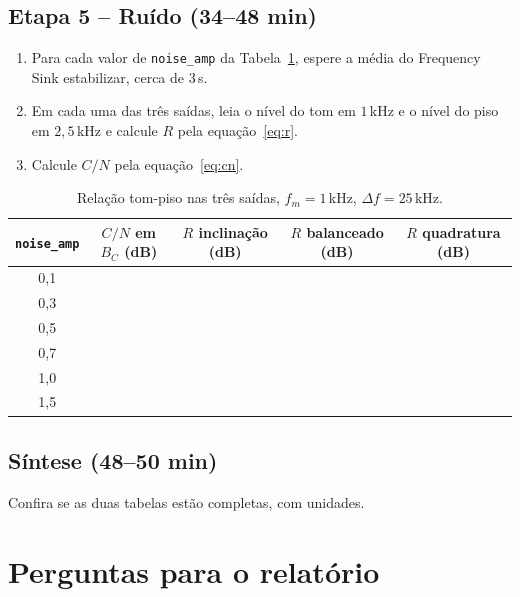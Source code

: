 \documentclass[11pt,a4paper]{article}
\begin{document}
\subsection*{Etapa 5 -- Ruído (34--48 min)}

\begin{instrucao}
\begin{enumerate}[label=\arabic*.]
  \item Para cada valor de \texttt{noise\_amp} da Tabela~\ref{tab:ruido},
    espere a média do Frequency Sink estabilizar, cerca de $3$\,s.
  \item Em cada uma das três saídas, leia o nível do tom em $1$\,kHz e o nível
    do piso em $2{,}5$\,kHz e calcule $R$ pela equação~\eqref{eq:r}.
  \item Calcule $C/N$ pela equação~\eqref{eq:cn}.
\end{enumerate}
\end{instrucao}

\begin{table}[H]
  \centering\small
  \begin{tabular}{c c c c c}
    \toprule
    \texttt{noise\_amp} & $C/N$ em $B_C$ (dB) & $R$ inclinação (dB) & $R$ balanceado (dB) & $R$ quadratura (dB) \\
    \midrule
    0,1 & & & & \\
    0,3 & & & & \\
    0,5 & & & & \\
    0,7 & & & & \\
    1,0 & & & & \\
    1,5 & & & & \\
    \bottomrule
  \end{tabular}
  \caption{Relação tom-piso nas três saídas, $f_m = 1$\,kHz, $\Delta f = 25$\,kHz.}
  \label{tab:ruido}
\end{table}

\subsection*{Síntese (48--50 min)}

Confira se as duas tabelas estão completas, com unidades.

\section{Perguntas para o relatório}
\end{document}
